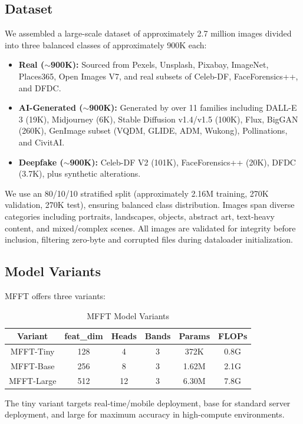 \documentclass[journal]{IEEEtran}
\begin{document}
\subsection{Dataset}
We assembled a large-scale dataset of approximately 2.7 million images divided into three balanced classes of approximately 900K each:
\begin{itemize}
    \item \textbf{Real ($\sim$900K):} Sourced from Pexels, Unsplash, Pixabay, ImageNet, Places365, Open Images V7, and real subsets of Celeb-DF, FaceForensics++, and DFDC.
    \item \textbf{AI-Generated ($\sim$900K):} Generated by over 11 families including DALL-E 3 (19K), Midjourney (6K), Stable Diffusion v1.4/v1.5 (100K), Flux, BigGAN (260K), GenImage subset (VQDM, GLIDE, ADM, Wukong), Pollinations, and CivitAI.
    \item \textbf{Deepfake ($\sim$900K):} Celeb-DF V2 (101K), FaceForensics++ (20K), DFDC (3.7K), plus synthetic alterations.
\end{itemize}
We use an 80/10/10 stratified split (approximately 2.16M training, 270K validation, 270K test), ensuring balanced class distribution. Images span diverse categories including portraits, landscapes, objects, abstract art, text-heavy content, and mixed/complex scenes. All images are validated for integrity before inclusion, filtering zero-byte and corrupted files during dataloader initialization.

\subsection{Model Variants}
MFFT offers three variants:
\begin{table}[!t]
\renewcommand{\arraystretch}{1.2}
\caption{MFFT Model Variants}
\label{tab:variants}
\centering
\begin{tabular}{|c|c|c|c|c|c|}
\hline
Variant & feat\_dim & Heads & Bands & Params & FLOPs \\
\hline
MFFT-Tiny & 128 & 4 & 3 & 372K & 0.8G \\
MFFT-Base & 256 & 8 & 3 & 1.62M & 2.1G \\
MFFT-Large & 512 & 12 & 3 & 6.30M & 7.8G \\
\hline
\end{tabular}
\end{table}
The tiny variant targets real-time/mobile deployment, base for standard server deployment, and large for maximum accuracy in high-compute environments.
\end{document}
